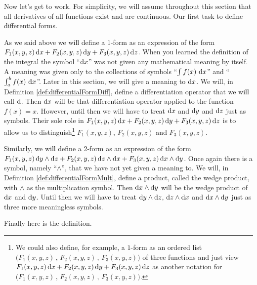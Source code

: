 Now let's get to work. For simplicity, we will assume throughout this 
section that all derivatives of all functions exist and are continuous.
Our first task to define differential forms. 

As we said above we will define a 1-form as an expression of the form 
$F_1(x,y,z)\,\mathrm{d}x
 + F_2(x,y,z)\,\mathrm{d}y
 + F_3(x,y,z)\,\mathrm{d}z$. When you learned the definition of the 
integral the symbol ``$\mathrm{d}x$'' was not given any mathematical 
meaning by itself. A meaning was given only to the collections of symbols 
``$\int f(x)\ \dee{x}$'' and ``$\int_a^b f(x)\ \dee{x}$''. 
Later in this section, we will give a meaning
to $\mathrm{d}x$. We will, in Definition \ref{def:differentialFormDiff},
define a differentiation operator that we will call $\mathrm{d}$. Then $\mathrm{d}x$
will be that differentiation operator applied to the function $f(x)=x$.
However, until then we will have to treat $\mathrm{d}x$ and $\mathrm{d}y$ and
$\mathrm{d}z$ just as symbols. Their sole role in 
$F_1(x,y,z)\,\mathrm{d}x
 + F_2(x,y,z)\,\mathrm{d}y
 + F_3(x,y,z)\,\mathrm{d}z$
is to allow us to distinguish\footnote{We could also define, 
for example, a $1$-form as an ordered list 
   $\big( F_1(x,y,z)\,,\,
          F_2(x,y,z)\,,\,
          F_3(x,y,z)\big)$ of three functions and just view
$ F_1(x,y,z)\,\mathrm{d}x
 + F_2(x,y,z)\,\mathrm{d}y
 + F_3(x,y,z)\,\mathrm{d}z$
as another notation for 
    $\big( F_1(x,y,z)\,,\,
          F_2(x,y,z)\,,\,
          F_3(x,y,z)\big)$.} 
$F_1(x,y,z)$, $F_2(x,y,z)$ and $F_3(x,y,z)$.

Similarly, we will define a 2-form as an expression of the form 
$F_1(x,y,z)\,\mathrm{d}y\wedge\mathrm{d}z
 + F_2(x,y,z)\,\mathrm{d}z\wedge\mathrm{d}x
 + F_3(x,y,z)\,\mathrm{d}x\wedge\mathrm{d}y$. 
Once again there is a symbol, namely ``$\wedge$'', that we have not yet given a meaning to. We will, in Definition \ref{def:differentialFormMult},
define a product, called the wedge product, with $\wedge$ as 
the multiplication symbol. 
Then $\mathrm{d}x\wedge\mathrm{d}y$ will be the wedge product of $\mathrm{d}x$ and 
$\mathrm{d}y$. Until then we will have to treat $\mathrm{d}y\wedge\mathrm{d}z$,
$\mathrm{d}z\wedge\mathrm{d}x$ and $\mathrm{d}x\wedge\mathrm{d}y$ just as three more
meaningless symbols.

Finally here is the definition.

